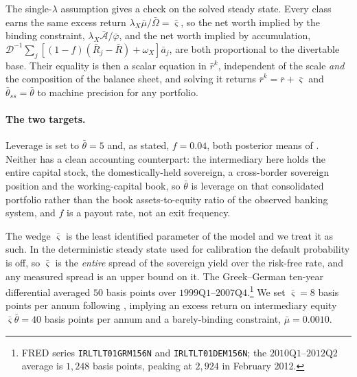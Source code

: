 The single-$\lambda$ assumption \citep[eq.~3]{bocola2016pass} gives a check on
the solved steady state. Every class earns the same excess return
$\lambda_X\bar\mu/\bar\Omega=\bar\varsigma$, so the net worth implied by the
binding constraint, $\lambda_X\bar{\mathcal A}/\bar\varphi$, and the net worth
implied by accumulation,
$\mathcal{D}^{-1}\sum_j[(1-f)(\bar R_j-\bar R)+\omega_X]\bar a_j$, are both
proportional to the divertable base. Their equality is then a scalar equation in
$\bar r^{k}$, independent of the scale \emph{and} the composition of the balance
sheet, and solving it returns $\bar r^{k}=\bar r+\bar\varsigma$ and
$\bar\theta_{ss}=\bar\theta$ to machine precision for any portfolio.

\paragraph{The two targets.}
Leverage is set to $\bar\theta=5$ and, as stated, $f=0.04$, both posterior means
of \citet{bocola2016pass}. Neither has a clean accounting counterpart: the
intermediary here holds the entire capital stock, the domestically-held
sovereign, a cross-border sovereign position and the working-capital book, so
$\bar\theta$ is leverage on that consolidated portfolio rather than the book
assets-to-equity ratio of the observed banking system, and $f$ is a payout rate,
not an exit frequency.

The wedge $\bar\varsigma$ is the least identified parameter of the model and we
treat it as such. In the deterministic steady state used for calibration the
default probability is off, so $\bar\varsigma$ is the \emph{entire} spread of the
sovereign yield over the risk-free rate, and any measured spread is an upper
bound on it. The Greek--German ten-year differential averaged $50$ basis points
over $1999\text{Q}1$--$2007\text{Q}4$.\footnote{FRED series
\texttt{IRLTLT01GRM156N} and \texttt{IRLTLT01DEM156N}; the $2010\text{Q}1$--$2012\text{Q}2$
average is $1{,}248$ basis points, peaking at $2{,}924$ in February 2012.} We set
$\bar\varsigma=8$ basis points per annum following \citet{bocola2016pass},
implying an excess return on intermediary equity
$\bar\varsigma\bar\theta=40$ basis points per annum and a barely-binding
constraint, $\bar\mu=0.0010$.


